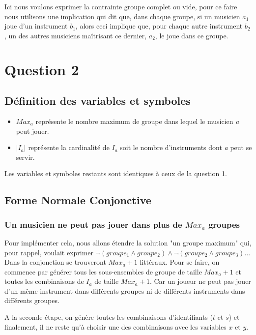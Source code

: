 \documentclass[11pt]{article}
\begin{document}
Ici nous voulons exprimer la contrainte groupe complet ou vide, pour ce faire nous utilisons une implication qui dit que, dans chaque groupe, si un musicien $a_1$ joue d'un instrument $b_1$, alors ceci implique que, pour chaque autre instrument $b_2$, un des autres musiciens maîtrisant ce dernier, $a_2$, le joue dans ce groupe.

\section{Question 2}

\subsection{Définition des variables et symboles}

\begin{itemize}
\item $Max_a$ représente le nombre maximum de groupe dans lequel le musicien \textit{a} peut jouer.
\item $|I_a|$ représente la cardinalité de $I_a$ soit le nombre d'instruments dont \textit{a} peut se servir.
\end{itemize}

Les variables et symboles restants sont identiques à ceux de la question 1.

\subsection{Forme Normale Conjonctive}

\subsubsection{Un musicien ne peut pas jouer dans plus de $Max_a$ groupes}

Pour implémenter cela, nous allons étendre la solution "un groupe maximum" qui, pour rappel, voulait exprimer $\neg (groupe_1 \wedge groupe_2) \wedge \neg (groupe_2 \wedge groupe_3) \ldots$
Dans la conjonction se trouveront $Max_a+1$ littéraux. Pour se faire, on commence par générer tous les sous-ensembles de groupe de taille $Max_a+1$ et toutes les combinaisons de $I_a$ de taille $Max_a+1$. Car un joueur ne peut pas jouer d'un même instrument dans différents groupes ni de différents instruments dans différents groupes. 

A la seconde étape, on génère toutes les combinaisons d'identifiants ($t$ et $s$) et finalement, il ne reste qu'à choisir une des combinaisons avec les variables $x$ et $y$.
\end{document}
